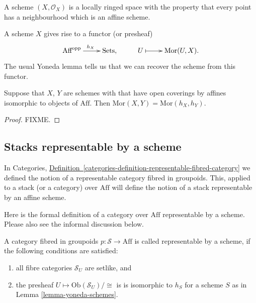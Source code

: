 \smallskip\noindent
A scheme $(X,\mathcal{O}_X)$ is a locally ringed space
with the property that every point has a neighbourhood which is an
affine scheme.

\smallskip\noindent
A scheme $X$ gives rise to a functor (or presheaf)
$$
\xymatrix{
\text{Aff}^{\text{opp}} \ar[r]^{h_X} & \text{Sets}, &
U \ar@{|->}[r] & \text{Mor}(U, X).}
$$
The usual Yoneda lemma tells us that we can recover the scheme from this
functor. 

\begin{lemma}
\label{lemma-yoneda-schemes}
Suppose that $X$, $Y$ are schemes with that have open coverings
by affines isomorphic to objects of $\text{Aff}$. Then $\text{Mor}(X,Y)
= \text{Mor}(h_X, h_Y)$.
\end{lemma}

\begin{proof}
FIXME.
\end{proof}

\subsection{Stacks representable by a scheme}
\label{subsection-stack-representable-by-scheme}

\noindent
In Categories, \hyperref[categories-definition-representable-fibred-category]%
{Definition~\ref*{categories-definition-representable-fibred-category}} we
defined the notion of a representable category fibred in groupoids. This,
applied to a stack (or a category) over $\text{Aff}$ will define the notion of
a stack representable by an affine scheme. 

\smallskip\noindent
Here is the formal definition of a category over $\text{Aff}$ representable by
a scheme. Please also see the informal discussion below.

\begin{definition}
\label{definition-representable-by-scheme}
A category fibred in groupoids $p : \mathcal{S} \to \text{Aff}$ is
called representable by a scheme, if the following conditions are satisfied:
\begin{enumerate}
\item all fibre categories $\mathcal{S}_U$ are setlike, and
\item the presheaf $U \mapsto \text{Ob}(\mathcal{S}_U)/\cong$ is 
is isomorphic to $h_S$ for a scheme $S$ as in
Lemma \ref{lemma-yoneda-schemes}.
\end{enumerate}
\end{definition}

